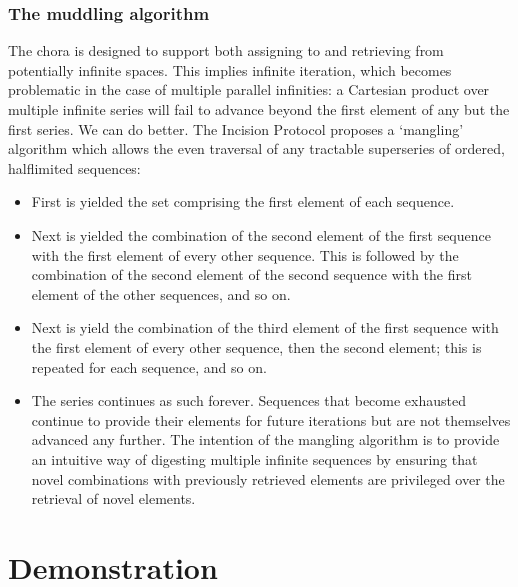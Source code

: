 \documentclass[letterpaper,10pt,english]{jupyterBook}
\begin{document}
\subsubsection{The muddling algorithm}
\label{\detokenize{content/chapter_03_everest/implementation:the-muddling-algorithm}}
\sphinxAtStartPar
The chora is designed to support both assigning to and retrieving from potentially infinite spaces. This implies infinite iteration, which becomes problematic in the case of multiple parallel infinities: a Cartesian product over multiple infinite series will fail to advance beyond the first element of any but the first series. We can do better. The Incision Protocol proposes a ‘mangling’ algorithm which allows the even traversal of any tractable superseries of ordered, half\sphinxhyphen{}limited sequences:
\begin{itemize}
\item {} 
\sphinxAtStartPar
First is yielded the set comprising the first element of each sequence.

\item {} 
\sphinxAtStartPar
Next is yielded the combination of the second element of the first sequence with the first element of every other sequence. This is followed by the combination of the second element of the second sequence with the first element of the other sequences, and so on.

\item {} 
\sphinxAtStartPar
Next is yield the combination of the third element of the first sequence with the first element of every other sequence, then the second element; this is repeated for each sequence, and so on.

\item {} 
\sphinxAtStartPar
The series continues as such forever. Sequences that become exhausted continue to provide their elements for future iterations but are not themselves advanced any further.
The intention of the mangling algorithm is to provide an intuitive way of digesting multiple infinite sequences by ensuring that novel combinations with previously retrieved elements are privileged over the retrieval of novel elements.

\end{itemize}


\section{Demonstration}
\label{\detokenize{content/chapter_03_everest/demonstration:demonstration}}\label{\detokenize{content/chapter_03_everest/demonstration::doc}}
\end{document}
